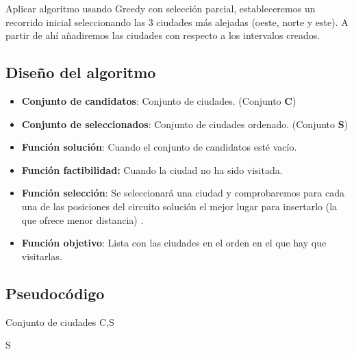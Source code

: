 		Aplicar algoritmo usando Greedy con selección parcial, estableceremos un recorrido inicial seleccionando las 3 ciudades más alejadas (oeste, norte y este). A partir de ahí añadiremos las ciudades con respecto a los intervalos creados.
		

	
	\subsection{Diseño del algoritmo} 
	
		\begin{itemize}
			\item \textbf{Conjunto de candidatos}: Conjunto de ciudades. (Conjunto \textbf{C})
			\item \textbf{Conjunto de seleccionados}: Conjunto de ciudades ordenado. (Conjunto \textbf{S})
			\item \textbf{Función solución}: Cuando el conjunto de candidatos esté vacío.
			\item \textbf{Función factibilidad:} Cuando la ciudad no ha sido visitada.
			\item \textbf{Función selección}: Se seleccionará una ciudad y comprobaremos para cada una de las posiciones del circuito solución el mejor lugar para insertarlo (la que ofrece menor distancia) .
			\item \textbf{Función objetivo}: Lista con las ciudades en el orden en el que hay que visitarlas.		
		\end{itemize}
		
	
	
	\subsection{Pseudocódigo}
			
		
		\begin{algorithmic}				
			\Require Conjunto de ciudades C,S
						\EndIf
					\EndFor
				\EndFor 
			\EndWhile 
			
			\Return S
		
		\end{algorithmic}

